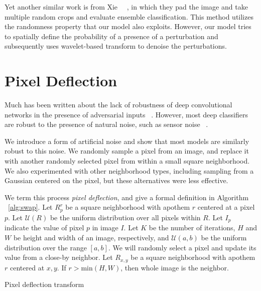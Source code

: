 Yet another similar work is from Xie ~\etal ~\cite{MitigatingAnon208}, in which they pad the image and take multiple random crops and evaluate ensemble classification. 
This method utilizes the randomness property that our model also exploits. 
However, our model tries to spatially define the probability of a presence of a perturbation and subsequently uses wavelet-based transform to denoise the perturbations.




\section{Pixel Deflection \label{sec:pdrop}}

Much has been written about the lack of robustness of deep convolutional networks in the presence of adversarial inputs ~\cite{EasilyFNguyen2015DeepNN,IntriguingSzegedy2013}.
However, most deep classifiers are robust to the presence of natural noise, such as sensor noise ~\cite{DirtyPODiamond2017}. 

We introduce a form of artificial noise and show that most models are similarly robust to this noise.
We randomly sample a pixel from an image, and replace it with another randomly selected pixel from within a small square neighborhood.  We also experimented with other neighborhood types, including sampling from a Gaussian centered on the pixel, but these alternatives were less effective.
 

We term this process \textit{pixel deflection}, and give a formal definition in Algorithm ~\ref{alg:swap}.
Let $R^r_{p}$ be a square neighborhood with apothem $r$ centered at a pixel $p$.
Let $\mathcal{U}(R)$ be the uniform distribution over all pixels within $R$.
Let $I_p$ indicate the value of pixel $p$ in image $I$.
Let $K$ be the number of iterations, $H$ and $W$ be height and width of an image, respectively, and $\mathcal{U}(a,b)$ be the uniform distribution over the range $[a,b]$. 
We will randomly select a pixel and update its value from a close-by neighbor.
Let $R_{x,y}$ be a square neighborhood with apothem $r$ centered at $x,y$.
If $r>\text{min}(H,W)$, then whole image is the neighbor. %


\begin{algorithm}[H]
    \caption[Pixel Deflection Transform]{Pixel deflection transform}
    \label{alg:swap}
\end{algorithm}


